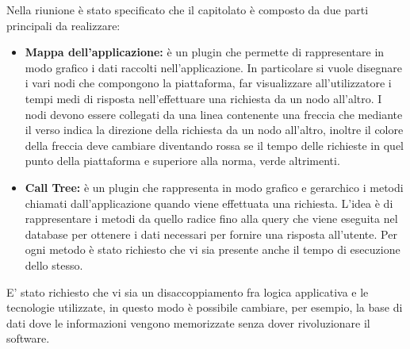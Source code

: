 \documentclass[a4paper, oneside, openany]{article}
\begin{document}
	Nella riunione è stato specificato che il capitolato è composto da due parti principali da realizzare:
			\begin{itemize}
				\item { \textbf{Mappa dell'applicazione:} è un plugin che permette di rappresentare in modo grafico i dati raccolti nell'applicazione. In particolare si vuole disegnare i vari nodi che compongono la piattaforma, far visualizzare all'utilizzatore i tempi medi di risposta nell'effettuare una richiesta da un nodo all'altro.
				I nodi devono essere collegati da una linea contenente una freccia che mediante il verso indica la direzione della richiesta da un nodo all'altro, inoltre il colore della freccia deve cambiare diventando rossa se il tempo delle richieste in quel punto della piattaforma e superiore alla norma, verde altrimenti.	
				}
				\item { \textbf{Call Tree:} è un plugin che rappresenta in modo grafico e gerarchico i metodi chiamati dall'applicazione quando viene effettuata una richiesta.
				L'idea è di rappresentare i metodi da quello radice fino alla query che viene eseguita nel database per ottenere i dati necessari per fornire una risposta all'utente. 
			    Per ogni metodo è stato richiesto che vi sia presente anche il tempo di esecuzione dello stesso.}
		
			\end{itemize}
		
		E' stato richiesto che vi sia un disaccoppiamento fra logica applicativa e le tecnologie utilizzate, in questo modo è possibile cambiare, per esempio, la base di dati dove le informazioni vengono memorizzate senza dover rivoluzionare il software.
		
		
		
		
		
			
	
	
	
\end{document}
